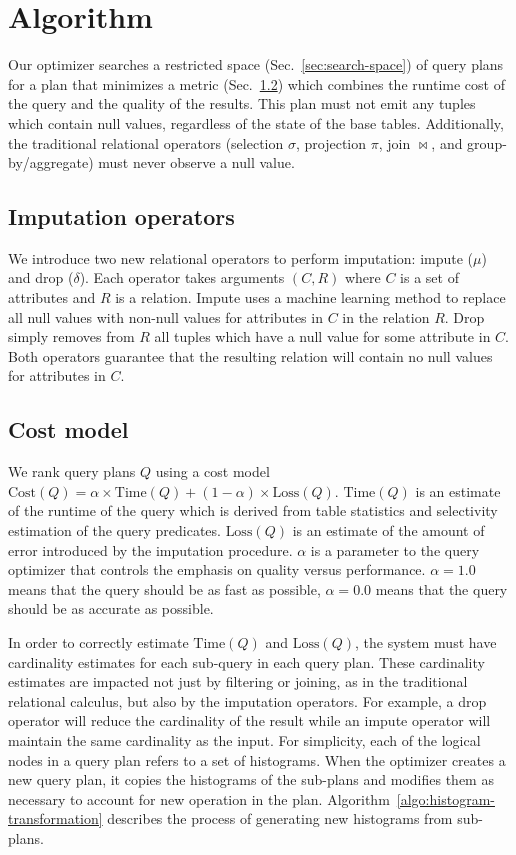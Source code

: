 \section{Algorithm}

Our optimizer searches a restricted space (Sec.~\ref{sec:search-space}) of query plans for a plan that minimizes a metric (Sec.~\ref{sec:cost-model}) which combines the runtime cost of the query and the quality of the results.
This plan must not emit any tuples which contain null values, regardless of the state of the base tables.
Additionally, the traditional relational operators (selection $\sigma$, projection $\pi$, join $\bowtie$, and group-by/aggregate) must never observe a null value.

\subsection{Imputation operators}
We introduce two new relational operators to perform imputation: impute ($\mu$) and drop ($\delta$). Each operator takes arguments $(C, R)$ where $C$ is a set of attributes and $R$ is a relation. Impute uses a machine learning method to replace all null values with non-null values for attributes in $C$ in the relation $R$. Drop simply removes from $R$ all tuples which have a null value for some attribute in $C$. Both operators guarantee that the resulting relation will contain no null values for attributes in $C$. 

\subsection{Cost model}
\label{sec:cost-model}
We rank query plans $Q$ using a cost model $\text{Cost}(Q) = \alpha \times \text{Time}(Q) + (1 - \alpha) \times \text{Loss}(Q)$. $\text{Time}(Q)$ is an estimate of the runtime of the query which is derived from table statistics and selectivity estimation of the query predicates. $\text{Loss}(Q)$ is an estimate of the amount of error introduced by the imputation procedure. $\alpha$ is a parameter to the query optimizer that controls the emphasis on quality versus performance. $\alpha = 1.0$ means that the query should be as fast as possible, $\alpha=0.0$ means that the query should be as accurate as possible.

In order to correctly estimate $\text{Time}(Q)$ and $\text{Loss}(Q)$, the system must have cardinality estimates
for each sub-query in each query plan.
These cardinality estimates are impacted not just by filtering or joining, as in the traditional relational calculus, but also by the imputation operators.
For example, a drop operator will reduce the cardinality of the result while an impute operator will maintain the same cardinality as the input.
For simplicity, each of the logical nodes in a query plan refers to a set of histograms.
When the optimizer creates a new query plan, it copies the histograms of the sub-plans and modifies them as necessary to account for new operation in the plan.
Algorithm~\ref{algo:histogram-transformation} describes the process of generating new histograms from sub-plans.

